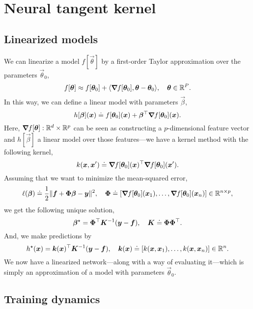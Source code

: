 \section{Neural tangent kernel}

\subsection{Linearized models}

We can linearize a model $f[\vec{\theta}]$ by a first-order Taylor approximation over the
parameters $\vec{\theta}_0$, \[
    f[\bm{\theta}] \approx f[\bm{\theta}_0] + \langle \bm{\nabla}_{\! } f[\bm{\theta}_0], \bm{\theta} - \bm{\theta}_0 \rangle, \quad \bm{\theta} \in \mathbb{R}^P.
\]
In this way, we can define a linear model with parameters $\vec{\beta}$, \[
    h[\bm{\beta}](\bm{x}) \doteq f[\bm{\theta}_0](\bm{x}) + \bm{\beta}^\top \bm{\nabla}_{\! } f[\bm{\theta}_0](\bm{x}).
\]
Here, $\bm{\nabla}_{\! } f[\bm{\theta}]: \mathbb{R}^d \times \mathbb{R}^p$ can be seen as constructing a $p$-dimensional
feature vector and $h[\vec{\beta}]$ a linear model over those features---we have a kernel method
with the following kernel, \[
    k(\bm{x}, \bm{x}') \doteq \bm{\nabla}_{\! } f[\bm{\theta}_0](\bm{x})^\top \bm{\nabla}_{\! } f[\bm{\theta}_0](\bm{x}').
\]
Assuming that we want to minimize the mean-squared error, \[
    \ell(\bm{\beta}) \doteq \frac{1}{2} \| \bm{f} + \bm{\Phi} \bm{\beta} - \bm{y} \|^2, \quad \bm{\Phi} \doteq [\bm{\nabla}_{\! } f[\bm{\theta}_0](\bm{x}_1), \ldots, \bm{\nabla}_{\! } f[\bm{\theta}_0](\bm{x}_n)] \in \mathbb{R}^{n \times p},
\]
we get the following unique solution, \[
    \bm{\beta}^\star = \bm{\Phi}^\top \bm{K}^{-1} (\bm{y} - \bm{f}), \quad \bm{K} \doteq \bm{\Phi} \bm{\Phi}^\top.
\]
And, we make predictions by \[
    h^\star(\bm{x}) = \bm{k}(\bm{x})^\top \bm{K}^{-1} (\bm{y} - \bm{f}), \quad \bm{k}(\bm{x}) \doteq [k(\bm{x}, \bm{x}_1), \ldots, k(\bm{x}, \bm{x}_n)] \in \mathbb{R}^n.
\]
We now have a linearized network---along with a way of evaluating it---which is simply an
approximation of a model with parameters $\vec{\theta}_0$.

\subsection{Training dynamics}

